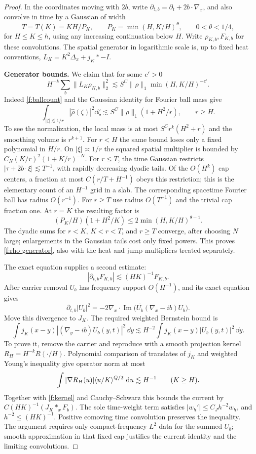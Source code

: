 \begin{proof}
In the coordinates moving with $2b$, write
$\partial_{t,b}=\partial_t+2b\cdot\nabla_x$, and also convolve in time
by a Gaussian of width
\[
 T=T(K)=KH/P_K,
 \qquad P_K=\min(H,K/H)^\theta,\qquad0<\theta<1/4,
\]
for $H\le K\le h$, using any increasing continuation below $H$.
Write $\rho_{K,b},F_{K,b}$ for these convolutions. The spatial
generator in logarithmic scale is, up to fixed heat conventions,
$L_K=K^2\Delta_x+j_K*-I$.

\smallskip\noindent\textbf{Generator bounds.}
We claim that for some $c'>0$
\begin{equation}\label{f:rho-generator}
 H^{-k}\sum_b\|L_K\rho_{K,b}\|_2^2
 \lesssim S^C\|\rho\|_1\min(H,K/H)^{-c'}.
\end{equation}
Indeed \eqref{f:ballcount} and the Gaussian identity for Fourier ball
mass give
\[
 \int_{|\zeta|\lesssim1/r}|\widehat\rho(\zeta)|^2\dd\zeta
 \lesssim S^C\|\rho\|_1(1+H^2/r),\qquad r\ge H.
\]
To see the normalization, the local mass is at most
$S^Cr^k(H^2+r)$ and the smoothing volume is $r^{k+1}$.
For $r<H$ the same bound loses only a fixed polynomial in $H/r$.
On $|\xi|\asymp1/r$ the squared spatial multiplier is bounded by
$C_N(K/r)^2(1+K/r)^{-N}$. For $r\le T$, the time Gaussian
restricts $|\tau+2b\cdot\xi|\lesssim T^{-1}$, with rapidly decreasing
dyadic tails. Of the $O(H^k)$ cap centers, a fraction at most
$C(r/T+H^{-1})$ obeys this restriction; this is the elementary count
of an $H^{-1}$ grid in a slab. The corresponding spacetime Fourier
ball has radius $O(r^{-1})$. For $r\ge T$ use radius $O(T^{-1})$ and
the trivial cap fraction one. At $r=K$ the resulting factor is
\[
 (P_K/H)(1+H^2/K)
 \le 2\min(H,K/H)^{\theta-1}.
\]
The dyadic sums for $r<K$, $K<r<T$, and $r\ge T$ converge, after
choosing $N$ large; enlargements in the Gaussian tails cost only fixed
powers. This proves \eqref{f:rho-generator}, also with the heat and
jump multipliers treated separately.

The exact equation supplies a second estimate:
\begin{equation}\label{f:current}
 |\partial_{t,b}F_{K,b}|\lesssim(HK)^{-1}F_{K,b}.
\end{equation}
After carrier removal $U_b$ has frequency support $O(H^{-1})$, and
its exact equation gives
\[
 \partial_{t,b}|U_b|^2
 =-2\nabla_x\!\cdot\operatorname{Im}
       \bigl(\overline{U_b}(\nabla_x-ib)U_b\bigr).
\]
Move this divergence to $J_K$. The required weighted Bernstein bound is
\[
 \int j_K(x-y)|(\nabla_y-ib)U_b(y,t)|^2\,\dd y
 \lesssim H^{-2}\int j_K(x-y)|U_b(y,t)|^2\,\dd y.
\]
To prove it, remove the carrier and reproduce with a smooth projection
kernel $R_H=H^{-k}R(\cdot/H)$. Polynomial comparison of translates of
$j_K$ and weighted Young's inequality give operator norm at most
\[
 \int|\nabla R_H(u)|\langle u/K\rangle^{Q/2}\,\,\mathrm d u\lesssim H^{-1}
 \qquad(K\ge H).
\]
Together with \eqref{f:kernel} and Cauchy--Schwarz this bounds the
current by $C(HK)^{-1}(J_K*_xF_b)$. The sole time-weight term satisfies
$|w_h'|\le C_Jh^{-2}w_h$, and $h^{-2}\le(HK)^{-1}$.
Positive comoving time convolution preserves the inequality. The
argument requires only compact-frequency $L^2$ data for the summed
$U_b$; smooth approximation in that fixed cap justifies the current
identity and the limiting convolutions.


\end{proof}
